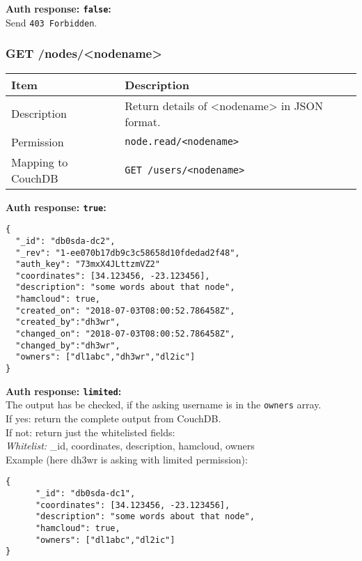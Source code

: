 \textbf{Auth response: \texttt{false}:}\\
Send \verb|403 Forbidden|.

\newpage
\subsubsection{GET /nodes/<nodename>}
\label{protocoldef:microservicesapi:database:getnodes/nodename}

\begin{table}[htbp]
  \begin{tabular}{|l|p{12cm}|} \hline
    Item               & Description  \\ \hline \hline
    Description        & Return details of <nodename> in JSON format. \\ \hline
    Permission         & \verb|node.read/<nodename>| \\ \hline
    Mapping to CouchDB & \verb|GET /users/<nodename>|\\ \hline
  \end{tabular}
\end{table}

\textbf{Auth response: \texttt{true}:}\\

\begin{lstlisting}
{
  "_id": "db0sda-dc2",
  "_rev": "1-ee070b17db9c3c58658d10fdedad2f48",
  "auth_key": "73mxX4JLttzmVZ2"
  "coordinates": [34.123456, -23.123456],
  "description": "some words about that node",
  "hamcloud": true,
  "created_on": "2018-07-03T08:00:52.786458Z",
  "created_by":"dh3wr",
  "changed_on": "2018-07-03T08:00:52.786458Z",
  "changed_by":"dh3wr",
  "owners": ["dl1abc","dh3wr","dl2ic"]
}
\end{lstlisting}

\textbf{Auth response: \texttt{limited}:}\\
The output has be checked, if the asking username is in the \texttt{owners} array.\\

If yes: return the complete output from CouchDB.\\
If not: return just the whitelisted fields:\\

\textit{Whitelist:} \_id, coordinates, description, hamcloud, owners\\

Example (here dh3wr is asking with limited permission):
\begin{lstlisting}
{
      "_id": "db0sda-dc1",
      "coordinates": [34.123456, -23.123456],
      "description": "some words about that node",
      "hamcloud": true,
      "owners": ["dl1abc","dl2ic"]
}
\end{lstlisting}

